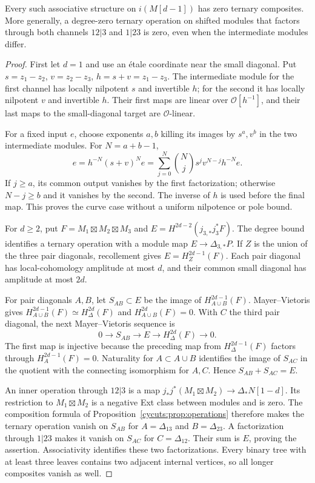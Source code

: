 \begin{theorem}\label{cycuts:thm:diagonal-nilpotence}
Every such associative structure on $i(M[d-1])$ has zero ternary
composites. More generally, a degree-zero ternary operation on shifted
modules that factors through both channels $12|3$ and $1|23$ is zero,
even when the intermediate modules differ.
\end{theorem}
\begin{proof}
First let $d=1$ and use an \'etale coordinate near the small diagonal.
Put $s=z_1-z_2$, $v=z_2-z_3$, $h=s+v=z_1-z_3$. The intermediate
module for the first channel has locally nilpotent $s$ and invertible
$h$; for the second it has locally nilpotent $v$ and invertible $h$.
Their first maps are linear over $\mathcal O[h^{-1}]$, and their
last maps to the small-diagonal target are $\mathcal O$-linear.

For a fixed input $e$, choose exponents $a,b$ killing its images
by $s^a,v^b$ in the two intermediate modules. For $N=a+b-1$,
\[
 e=h^{-N}(s+v)^Ne
   =\sum_{j=0}^N\binom Nj s^jv^{N-j}h^{-N}e.
\]
If $j\ge a$, its common output vanishes by the first factorization;
otherwise $N-j\ge b$ and it vanishes by the second. The inverse
of $h$ is used before the final map. This proves the curve case
without a uniform nilpotence or pole bound.

For $d\ge2$, put $F=M_1\boxtimes M_2\boxtimes M_3$ and
$E=H^{2d-2}(j_{3,*}j_3^*F)$. The degree bound identifies a ternary
operation with a module map $E\to\Delta_{3,*}P$. If $Z$ is
the union of the three pair diagonals, recollement gives
$E=H_Z^{2d-1}(F)$. Each pair diagonal has local-cohomology
amplitude at most $d$, and their common small diagonal has
amplitude at most $2d$.

For pair diagonals $A,B$, let $S_{AB}\subset E$ be the image
of $H_{A\cup B}^{2d-1}(F)$. Mayer--Vietoris gives
$H_{A\cup B}^{2d-1}(F)\simeq H_\Delta^{2d}(F)$ and
$H_{A\cup B}^{2d}(F)=0$. With $C$ the third pair diagonal,
the next Mayer--Vietoris sequence is
\[
 0\longrightarrow S_{AB}\longrightarrow E
             \longrightarrow H_\Delta^{2d}(F)\longrightarrow0.
\]
The first map is injective because the preceding map from
$H_\Delta^{2d-1}(F)$ factors through $H_A^{2d-1}(F)=0$.
Naturality for $A\subset A\cup B$ identifies the image of
$S_{AC}$ in the quotient with the connecting isomorphism for
$A,C$. Hence $S_{AB}+S_{AC}=E$.

An inner operation through $12|3$ is a map
$j_*j^*(M_1\boxtimes M_2)\to\Delta_*N[1-d]$.
Its restriction to $M_1\boxtimes M_2$ is a negative Ext class
between modules and is zero. The composition formula of
Proposition~\ref{cycuts:prop:operations} therefore makes the ternary
operation vanish on $S_{AB}$ for $A=\Delta_{13}$ and
$B=\Delta_{23}$. A factorization through $1|23$ makes it vanish
on $S_{AC}$ for $C=\Delta_{12}$. Their sum is $E$, proving
the assertion. Associativity identifies these two factorizations.
Every binary tree with at least three leaves contains two adjacent
internal vertices, so all longer composites vanish as well.
\end{proof}

